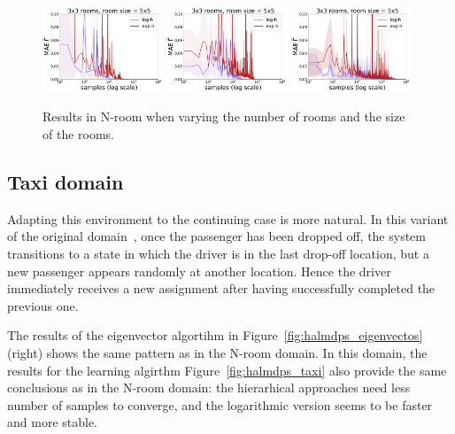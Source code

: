 \begin{figure}
  \includegraphics*[width=0.32\textwidth]{figures/chapter2/online/nrooms_3_3_gammas_1.png}
  \includegraphics*[width=0.32\textwidth]{figures/chapter2/online/nrooms_5_5_gammas_1.png}
  \includegraphics*[width=0.32\textwidth]{figures/chapter2/online/nrooms_8_8_gammas_1.png}


  \caption{Results in N-room when varying the number of rooms and the size of the rooms.}
  \label{fig:halmdps_nrooms}
  \end{figure}
  


  \subsection{Taxi domain}
  Adapting this environment to the continuing case is more natural. In this variant of the original domain~\citep{Dietterich2000}, once the passenger has been dropped off, the system transitions to a state in which the driver is in the last drop-off location, but a new passenger appears randomly at another location. Hence the driver immediately receives a new assignment after having successfully completed the previous one. 

  The results of the eigenvector algortihm in Figure~\ref{fig:halmdps_eigenvectos} (right) shows the same pattern as in the N-room domain. In this domain, the results for the learning algirthm Figure~\ref{fig:halmdps_taxi} also provide the same conclusions as in the N-room domain: the hierarhical approaches need less number of samples to converge, and the logarithmic version seems to be faster and more stable.




